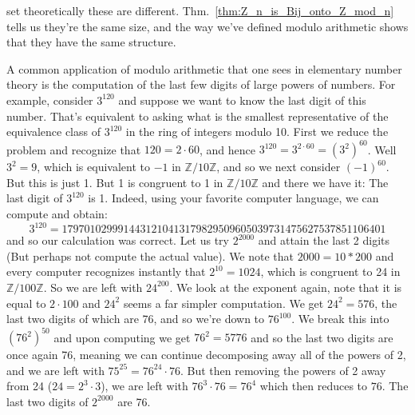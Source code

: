 \documentclass{article}                                                        %
\begin{document}
            set theoretically these are different.
            Thm.~\ref{thm:Z_n_is_Bij_onto_Z_mod_n} tells us they're the same size,
            and the way we've defined modulo arithmetic shows that they have the
            same structure.
            \begin{example}
                A common application of modulo arithmetic that one sees in
                elementary number theory is the computation of the last few digits
                of large powers of numbers. For example, consider $3^120$ and
                suppose we want to know the last digit of this number. That's
                equivalent to asking what is the smallest representative of the
                equivalence class of $3^{120}$ in the ring of integers modulo 10.
                First we reduce the problem and recognize that $120=2\cdot{60}$, and
                hence $3^{120}=3^{2\cdot{60}}=(3^{2})^{60}$. Well $3^{2}=9$, which
                is equivalent to $\minus{1}$ in $\mathbb{Z}/10\mathbb{Z}$, and so we
                next consider $(\minus{1})^{60}$. But this is just 1.
                But 1 is congruent to 1 in $\mathbb{Z}/10\mathbb{Z}$ and there we
                have it: The last digit of $3^{120}$ is 1. Indeed, using your
                favorite computer language, we can compute and obtain:
                \begin{equation}
                    3^{120}=
                    1797010299914431210413179829509605039731475627537851106401
                \end{equation}
                and so our calculation was correct. Let us try $2^{2000}$ and attain
                the last 2 digits (But perhaps not compute the actual value). We
                note that $2000=10*200$ and every computer recognizes instantly that
                $2^{10}=1024$, which is congruent to 24 in
                $\mathbb{Z}/100\mathbb{Z}$. So we are left with $24^{200}$. We look
                at the exponent again, note that it is equal to $2\cdot{100}$ and
                $24^{2}$ seems a far simpler computation. We get
                $24^{2}=576$, the last two digits of which are 76, and so we're down
                to $76^{100}$. We break this into $(76^{2})^{50}$ and upon computing
                we get $76^{2}=5776$ and so the last two digits are once again 76,
                meaning we can continue decomposing away all of the powers of 2,
                and we are left with $75^{25}=76^{24}\cdot{76}$. But then removing
                the powers of 2 away from 24 ($24=2^{3}\cdot{3}$), we are left with
                $76^{3}\cdot{76}=76^{4}$ which then reduces to $76$. The last two
                digits of $2^{2000}$ are 76.
            \end{example}
\end{document}
